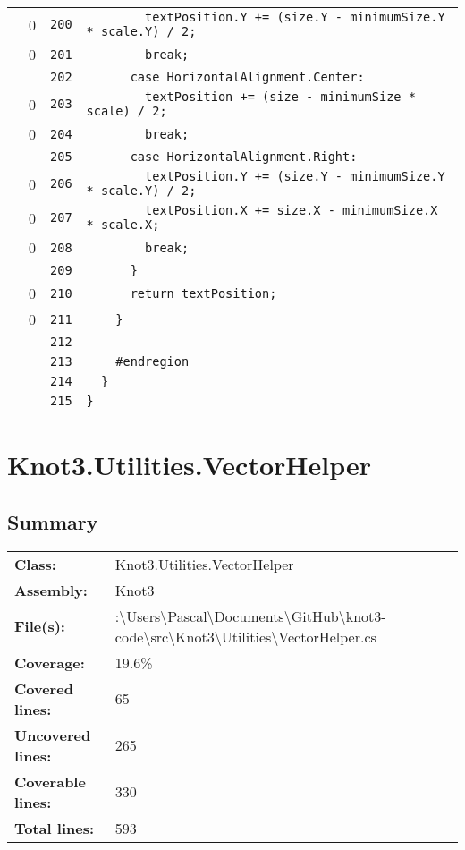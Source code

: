 \documentclass[a4paper,10pt]{article}
\begin{document}
\begin{longtable}[l]{lrrl}
\cellcolor{red} & 0 & \verb~200~ & \verb~        textPosition.Y += (size.Y - minimumSize.Y * scale.Y) / 2;~\\
\cellcolor{red} & 0 & \verb~201~ & \verb~        break;~\\
\cellcolor{gray} &  & \verb~202~ & \verb~      case HorizontalAlignment.Center:~\\
\cellcolor{red} & 0 & \verb~203~ & \verb~        textPosition += (size - minimumSize * scale) / 2;~\\
\cellcolor{red} & 0 & \verb~204~ & \verb~        break;~\\
\cellcolor{gray} &  & \verb~205~ & \verb~      case HorizontalAlignment.Right:~\\
\cellcolor{red} & 0 & \verb~206~ & \verb~        textPosition.Y += (size.Y - minimumSize.Y * scale.Y) / 2;~\\
\cellcolor{red} & 0 & \verb~207~ & \verb~        textPosition.X += size.X - minimumSize.X * scale.X;~\\
\cellcolor{red} & 0 & \verb~208~ & \verb~        break;~\\
\cellcolor{gray} &  & \verb~209~ & \verb~      }~\\
\cellcolor{red} & 0 & \verb~210~ & \verb~      return textPosition;~\\
\cellcolor{red} & 0 & \verb~211~ & \verb~    }~\\
\cellcolor{gray} &  & \verb~212~ & \verb~~\\
\cellcolor{gray} &  & \verb~213~ & \verb~    #endregion~\\
\cellcolor{gray} &  & \verb~214~ & \verb~  }~\\
\cellcolor{gray} &  & \verb~215~ & \verb~}~\\
\end{longtable}
\newpage
\section{Knot3.Utilities.VectorHelper}
\subsection{Summary}
\begin{longtable}[l]{ll}
\textbf{Class:} & Knot3.Utilities.VectorHelper\\
\textbf{Assembly:} & Knot3\\
\textbf{File(s):} & \begin{minipage}[t]{12cm}{:\textbackslash Users\textbackslash Pascal\textbackslash Documents\textbackslash GitHub\textbackslash knot3-code\textbackslash src\textbackslash Knot3\textbackslash Utilities\textbackslash VectorHelper.cs}\end{minipage} \\
\textbf{Coverage:} & 19.6\%\\
\textbf{Covered lines:} & 65\\
\textbf{Uncovered lines:} & 265\\
\textbf{Coverable lines:} & 330\\
\textbf{Total lines:} & 593\\
\end{longtable}
\end{document}
